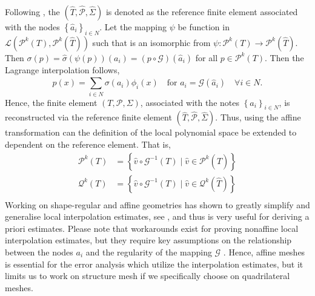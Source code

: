 Following \cite[Example 9.4]{ErnGuermond2021}, the $ ( \hat{T}, \hat{\mathcal{P} }, \hat{\Sigma} ) $ is denoted as the reference finite element associated with the nodes $\left\{ \hat{a}_{i} \right\}_{i\in N} $. Let the mapping $\psi $ be function in $\mathcal{L}( \mathcal{P} ^{k}( T), \mathcal{P} ^{k}(\hat{T}
)  )  $ such that is an isomorphic from  $ \psi : \mathcal{P} ^{k}( T) \to \mathcal{P} ^{k}( \hat{T})   $.  Then $\sigma ( p) = \hat{\sigma }( \psi ( p) ) (a_{i} )  = ( p \circ \mathcal{G} )( \hat{a}_{i})      $ for all $p \in \mathcal{P}^{k}( T)  $.
Then the Lagrange interpolation follows,  \[
    p (x) = \sum_{i \in N }^{} \sigma ( a_{i}) \phi_{i}( x) \quad \text{for } a_{i} = \mathcal{G}( \hat{a}_{i}) \quad  \forall i \in N     .
\]
Hence, the finite element $( T, \mathcal{P}, \Sigma  ) $, associated with the notes $\left\{ a_{i} \right\}_{i\in N} $, is reconstructed via the reference finite element $( \hat{T}, \hat{\mathcal{P} }, \hat{\Sigma} ) $.
Thus, using the affine transformation can the definition of the local polynomial space be extended to dependent on the reference element. That is, \[
    \begin{split}
\mathcal{P}^{k}( T) & = \left\{ \hat{v} \circ  \mathcal{G}^{-1}( T)   \mid  \hat{v} \in \mathcal{P}^{k}( \hat{T})      \right\} \\
\mathcal{Q}^{k}( T) & = \left\{ \hat{v} \circ  \mathcal{G}^{-1}( T)     \mid  \hat{v} \in \mathcal{Q}^{k}( \hat{T})      \right\} \\
    \end{split}
\]
Working on shape-regular and affine geometries has shown to greatly simplify and generalise local interpolation estimates, see \cite[Theorem 11.12]{ErnGuermond2021}, and thus is very useful for deriving a priori estimates.
Please note that workarounds exist for proving nonaffine local interpolation estimates, but they require key assumptions on the relationship between the nodes $a_{i}$ and the regularity of the mapping $\mathcal{G} $ \cite[Chapter 13]{ErnGuermond2021}.
Hence, affine meshes is essential for the error analysis which utilize the interpolation estimates, but it limits us to work on structure mesh if we specifically choose on quadrilateral meshes.

